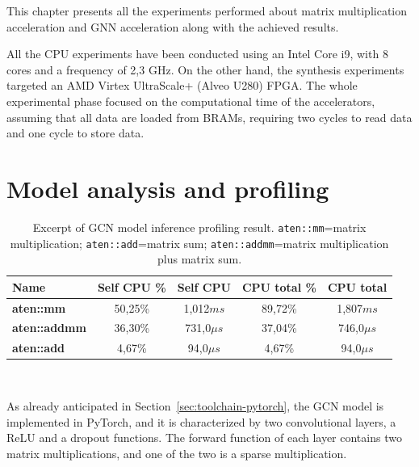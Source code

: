 This chapter presents all the experiments performed about matrix multiplication acceleration and GNN acceleration along with the achieved results.

All the CPU experiments have been conducted using an Intel Core i9, with 8 cores and a frequency of 2,3 GHz.
On the other hand, the synthesis experiments targeted an AMD Virtex UltraScale+ (Alveo U280) FPGA\@.
The whole experimental phase focused on the computational time of the accelerators, assuming that all data are loaded from BRAMs, requiring two cycles to read data and one cycle to store data.


\section{Model analysis and profiling}
\label{sec:model-analysis}%

\begin{table}[b]
\centering
    \begin{tabular}{|p{6em} c c c c|}
    \hline
    \textbf{Name} & \textbf{Self CPU \%} & \textbf{Self CPU} & \textbf{CPU total \%} & \textbf{CPU total} \T\B \\
    \hline \hline
    \textbf{aten::mm} & 50,25\% & 1,012$ms$ & 89,72\% & 1,807$ms$ \T\B\\
    \hline
    \textbf{aten::addmm} & 36,30\% & 731,0$\mu s$ & 37,04\% & 746,0$\mu s$ \T\B\\
    \hline
    \textbf{aten::add} & 4,67\% & 94,0$\mu s$ & 4,67\% & 94,0$\mu s$ \T\B\\
    \hline
    \end{tabular}
    \\[10pt]
    \caption[Excerpt of GCN model inference profiling result]{Excerpt of GCN model inference profiling result. \lstinline{aten::mm}=matrix multiplication; \lstinline{aten::add}=matrix sum; \lstinline{aten::addmm}=matrix multiplication plus matrix sum.}
    \label{tab:gcn_profiling}
\end{table}

As already anticipated in Section~\ref{sec:toolchain-pytorch}, the GCN model is implemented in PyTorch, and it is characterized by two convolutional layers, a ReLU and a dropout functions.
The forward function of each layer contains two matrix multiplications, and one of the two is a sparse multiplication.

